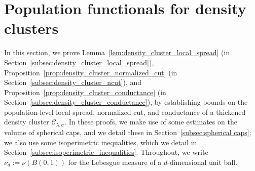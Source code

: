 \documentclass{article}
\newcommand{\1}{\mathbf{1}}
\newcommand{\mc}[1]{\mathcal{#1}}
\theoremstyle{definition}
\theoremstyle{remark}
\begin{document}
\section{Population functionals for density clusters}
\label{sec:density_cluster_population_functionals}
In this section, we prove Lemma~\ref{lem:density_cluster_local_spread} (in Section~\ref{subsec:density_cluster_local_spread}), Proposition~\ref{prop:density_cluster_normalized_cut} (in Section~\ref{subsec:density_cluster_ncut}), and Proposition~\ref{prop:density_cluster_conductance} (in Section~\ref{subsec:density_cluster_conductance}), by establishing bounds on the population-level local spread, normalized cut, and conductance of a thickened density cluster $\mc{C}_{\lambda,\sigma}$. In these proofs, we make use of some estimates on the volume of spherical caps, and we detail these in Section~\ref{subsec:spherical caps}; we also use some isoperimetric inequalities, which we detail in Section~\ref{subsec:isoperimetric_inequalities}. Throughout, we write $\nu_d := \nu(B(0,1))$ for the Lebesgue measure of a $d$-dimensional unit ball.
\end{document}
